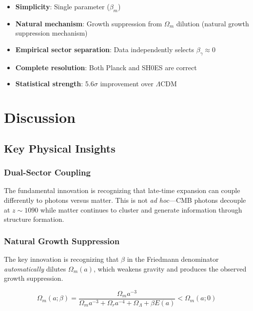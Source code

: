 \documentclass[11pt,letterpaper]{article}
\begin{document}
\begin{itemize}
\item \textbf{Simplicity}: Single parameter ($\beta_m$)
\item \textbf{Natural mechanism}: Growth suppression from $\Omega_m$ dilution (natural growth suppression mechanism)
\item \textbf{Empirical sector separation}: Data independently selects $\beta_\gamma \approx 0$
\item \textbf{Complete resolution}: Both Planck and SH0ES are correct
\item \textbf{Statistical strength}: 5.6$\sigma$ improvement over $\Lambda$CDM
\end{itemize}

\section{Discussion}

\subsection{Key Physical Insights}

\subsubsection{Dual-Sector Coupling}

The fundamental innovation is recognizing that late-time expansion can couple differently to photons versus matter. This is not \textit{ad hoc}—CMB photons decouple at $z \sim 1090$ while matter continues to cluster and generate information through structure formation.

\subsubsection{Natural Growth Suppression}

The key innovation is recognizing that $\beta$ in the Friedmann denominator \textit{automatically} dilutes $\Omega_m(a)$, which weakens gravity and produces the observed growth suppression.

\begin{equation}
\Omega_m(a; \beta) = \frac{\Omega_m a^{-3}}{\Omega_m a^{-3} + \Omega_r a^{-4} + \Omega_\Lambda + \beta E(a)} < \Omega_m(a; 0)
\end{equation}
\end{document}
